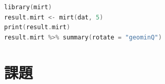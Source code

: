 \documentclass{ltjsbook}
\begin{document}
\begin{lstlisting}[language=c++,label={code::11_06},caption={mirtの実行}]
library(mirt)
result.mirt <- mirt(dat, 5)
print(result.mirt)
result.mirt %>% summary(rotate = "geominQ")
\end{lstlisting}


\section{課題}
\end{document}
